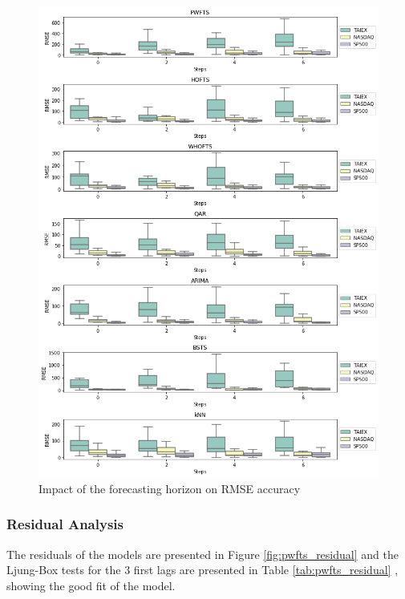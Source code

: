 \begin{figure}[htb]
    \centering
    \includegraphics[width=\textwidth]{figures/pwfts_ahead_point.png}
    \caption{Impact of the forecasting horizon on RMSE accuracy}
    \label{fig:pwfts_ahead_point}
\end{figure}

\subsubsection{Residual Analysis}
\label{sec:pwfts_residual}

The residuals of the models are presented in Figure \ref{fig:pwfts_residual} and the Ljung-Box tests for the 3 first lags are presented in Table \ref{tab:pwfts_residual} , showing the good fit of the model. 

